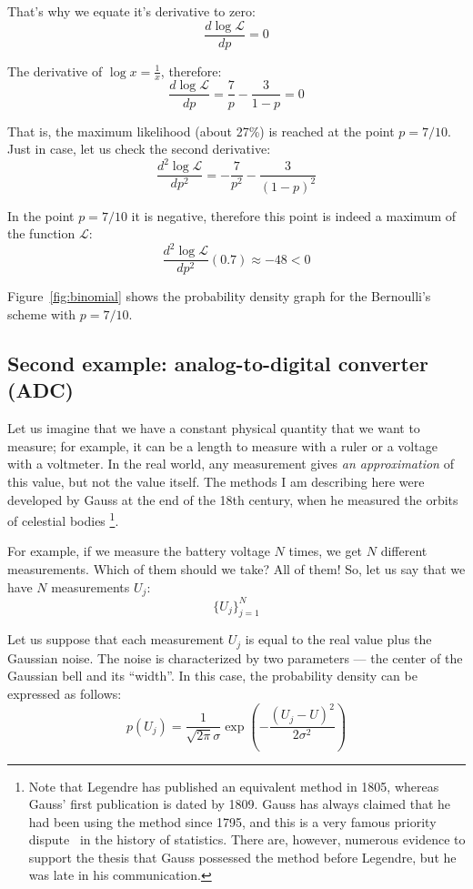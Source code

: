 \documentclass{article}
\begin{document}
That's why we equate it's derivative to zero:
$$\frac{d \log \mathcal{L}}{dp} = 0$$

The derivative of $\log x = \frac{1}{x}$, therefore:
$$\frac{d \log \mathcal{L}}{dp} = \frac{7}{p} - \frac{3}{1-p} = 0$$

That is, the maximum likelihood (about 27\%) is reached at the point $p=7/10$.
Just in case, let us check the second derivative:
$$\frac{d^2 \log \mathcal{L}}{dp^2} = -\frac{7}{p^2} - \frac{3}{(1-p)^2}$$

In the point $p=7/10$ it is negative, therefore this point is indeed a maximum of the function $\mathcal{L}$:
$$\frac{d^2 \log \mathcal{L}}{dp^2}(0.7)  \approx -48 < 0$$

Figure~\ref{fig:binomial} shows the probability density graph for the Bernoulli's scheme with $p=7/10$.


\subsection{Second example: analog-to-digital converter (ADC)}

Let us imagine that we have a constant physical quantity that we want to measure; for example, it can be a length to measure with a ruler or a voltage with a voltmeter.
In the real world, any measurement gives \textit{an approximation} of this value, but not the value itself.
The methods I am describing here were developed by Gauss at the end of the 18th century, when he measured the orbits of celestial bodies
\footnote{Note that Legendre has published an equivalent method in 1805, 
whereas Gauss' first publication is dated by 1809. Gauss has always claimed that he had been using the method since 1795,
and this is a very famous priority dispute~\cite{https://projecteuclid.org/download/pdf_1/euclid.aos/1176345451} in the history of statistics.
There are, however, numerous evidence to support the thesis that Gauss possessed the method before Legendre, but he was late in his communication.}.
~\cite{Theoria Motus Corporum Coelestium}

For example, if we measure the battery voltage $N$ times, we get $N$ different measurements. Which of them should we take? All of them! 
So, let us say that we have $N$ measurements $U_j$:
$$
\{U_j\}_{j=1}^{N}
$$

Let us suppose that each measurement $U_j$ is equal to the real value plus the Gaussian noise. 
The noise is characterized by two parameters --- the center of the Gaussian bell and its ``width''. 
In this case, the probability density can be expressed as follows:
$$
p(U_j) = \frac{1}{\sqrt{2\pi}\sigma} \exp\left(-\frac{(U_j-U)^2}{2\sigma^2}\right)
$$
\end{document}
